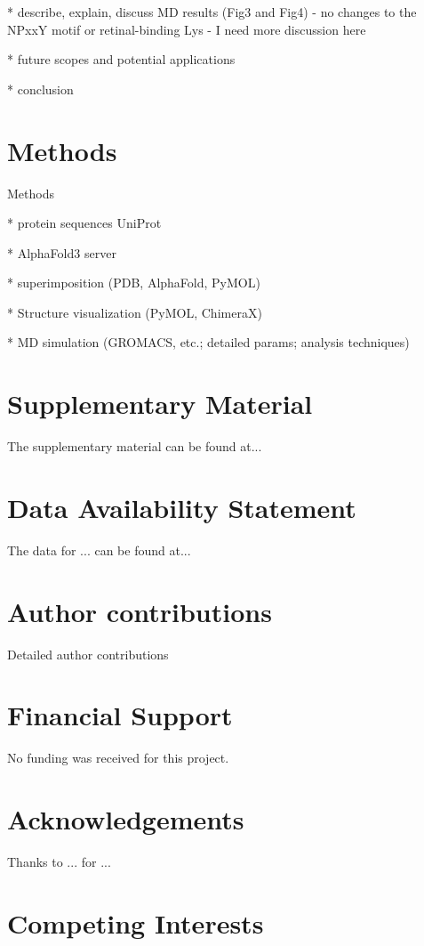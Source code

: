 \documentclass[fleqn,10pt,lineno]{manuscript}
\begin{document}
* describe, explain, discuss MD results (Fig3 and Fig4)
        - no changes to the NPxxY motif or retinal-binding Lys
	- I need more discussion here

* future scopes and potential applications

* conclusion

\section*{Methods}

Methods

* protein sequences UniProt

* AlphaFold3 server

* superimposition (PDB, AlphaFold, PyMOL)

* Structure visualization (PyMOL, ChimeraX)

* MD simulation (GROMACS, etc.; detailed params; analysis techniques)


\section*{Supplementary Material}

The supplementary material can be found at...


\section*{Data Availability Statement} 

The data for ... can be found at...


\section*{Author contributions}

Detailed author contributions


\section*{Financial Support}

No funding was received for this project. 


\section*{Acknowledgements}

Thanks to ... for ...


\section*{Competing Interests}
\end{document}
